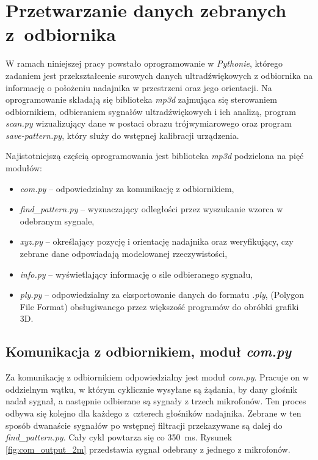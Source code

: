 \chapter{Przetwarzanie danych zebranych z~odbiornika}

W ramach niniejszej pracy powstało oprogramowanie w \textit{Pythonie}, którego zadaniem jest
przekształcenie surowych danych ultradźwiękowych 
z odbiornika na informację o położeniu nadajnika w przestrzeni oraz jego orientacji.
Na oprogramowanie składają się biblioteka \textit{mp3d} zajmująca się
sterowaniem odbiornikiem, odbieraniem sygnałów ultradźwiękowych i ich analizą, program \textit{scan.py}
wizualizujący dane w postaci obrazu trójwymiarowego oraz program \textit{save-pattern.py},
który służy do wstępnej kalibracji urządzenia.

Najistotniejszą częścią oprogramowania jest biblioteka \textit{mp3d} podzielona na pięć modułów:
\begin{itemize}
 \item \textit{com.py} --  odpowiedzialny za komunikację z odbiornikiem,
 \item \textit{find\_pattern.py} --  wyznaczający odległości przez wyszukanie wzorca w odebranym sygnale,
 \item \textit{xyz.py} --  określający pozycję i orientację nadajnika oraz  weryfikujący, 
 czy zebrane dane odpowiadają modelowanej rzeczywistości,
 \item \textit{info.py} --  wyświetlający informację o sile odbieranego sygnału,
 \item \textit{ply.py} --  odpowiedzialny za eksportowanie danych do formatu \textit{.ply},
    (Polygon File Format) obsługiwanego przez większość programów do obróbki grafiki 3D.
\end{itemize}


\section{Komunikacja z odbiornikiem, moduł \textit{com.py}}

Za komunikację z odbiornikiem odpowiedzialny jest moduł \textit{com.py}.
Pracuje on w oddzielnym wątku, w którym cyklicznie wysyłane są żądania, by dany głośnik nadał sygnał,
a następnie odbierane są sygnały z trzech mikrofonów.
Ten proces odbywa się kolejno dla każdego z~czterech głośników nadajnika.
Zebrane w ten sposób dwanaście sygnałów po wstępnej filtracji przekazywane są dalej do \textit{find\_pattern.py}. Cały cykl powtarza 
się co \SI{350}{ms}. Rysunek \ref{fig:com_output_2m} przedstawia sygnał odebrany z jednego z mikrofonów.


